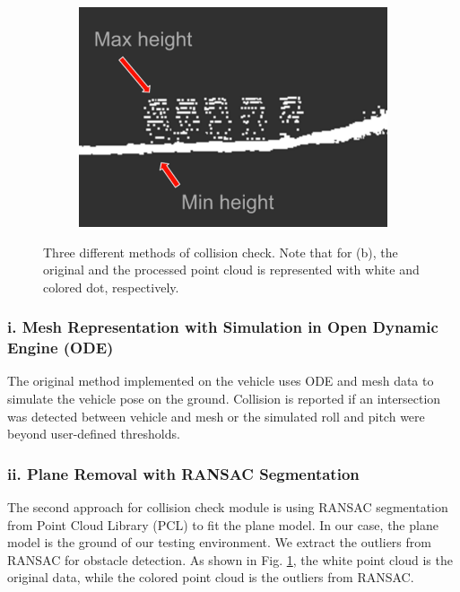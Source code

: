 \documentclass[../thesis.tex]{subfiles}
\begin{document}
\begin{figure}[t]
\begin{subfigure}[b]{0.3\linewidth}
		\label{fig:collision_ransac}
	\end{subfigure}
	\begin{subfigure}[b]{0.3\linewidth}
		\includegraphics[width=\columnwidth]{./RRTPlanner/fig/height_map.png}
		\label{fig:collision_height_map}
	\end{subfigure}
	\caption{Three different methods of collision check. Note that for (b), the original and the processed point cloud is represented with white and colored dot, respectively.}
    \label{fig:collision}
\end{figure}


\subsubsection{i. Mesh Representation with Simulation in Open Dynamic Engine (ODE) \cite{wettergreen2012developing}}
The original method implemented on the vehicle uses ODE and mesh data to simulate the vehicle pose on the ground. Collision is reported if an intersection was detected between vehicle and mesh or the simulated roll and pitch were beyond user-defined thresholds. 

\subsubsection{ii. Plane Removal with RANSAC Segmentation \cite{fischler1981random}}
The second approach for collision check module is using RANSAC segmentation from Point Cloud Library (PCL) to fit the plane model. In our case, the plane model is the ground of our testing environment. We extract the outliers from RANSAC for obstacle detection. As shown in Fig. \ref{fig:collision_ransac}, the white point cloud is the original data, while the colored point cloud is the outliers from RANSAC. 
\end{document}
